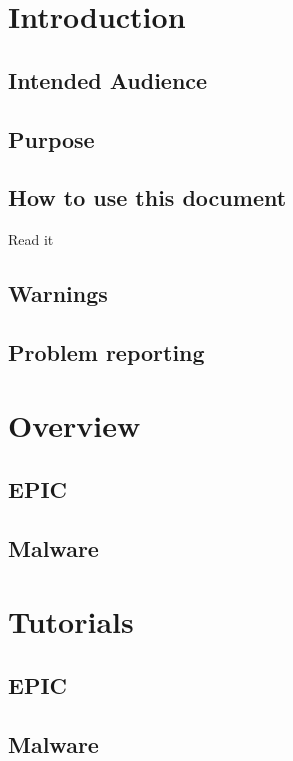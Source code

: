 \documentclass[a4paper,12pt,titlepage]{article}
\begin{document}
	
	
	\newpage
	\tableofcontents

\newpage	\section{Introduction}
	\subsection{Intended Audience}
	\subsection{Purpose}
	\subsection{How to use this document} Read it
	\subsection{Warnings}
	\subsection{Problem reporting}

\newpage	\section{Overview}
	\subsection{EPIC}
	\subsection{Malware}


\newpage	\section{Tutorials}
	\subsection{EPIC}
	\subsection{Malware}
\end{document}
